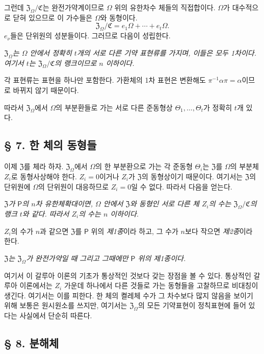 그런데 \(\mathfrak Z_\Omega/\mathfrak C\)는 완전가약계이므로 \(\Omega\) 위의 유한차수 체들의 직접합이다. \(\Omega\)가 대수적으로 닫혀 있으므로 이 가수들은 \(\Omega\)와 동형이다.
\[
        \mathfrak Z_\Omega/\mathfrak C
        =e_1\Omega+\cdots+e_t\Omega.
\]
\(e_\nu\)들은 단위원의 성분들이다. 그러므로 다음이 성립한다.

\emph{\(\mathfrak Z_\Omega\)는 \(\Omega\) 안에서 정확히 \(t\)개의 서로 다른 기약 표현류를 가지며, 이들은 모두 1차이다. 여기서 \(t\)는 \(\mathfrak Z_\Omega/\mathfrak C\)의 랭크이므로 \(n\) 이하이다.}

각 표현류는 표현을 하나만 포함한다. 가환체의 1차 표현은 변환해도 \(\pi^{-1}\alpha\pi=\alpha\)이므로 바뀌지 않기 때문이다.

따라서 \(\mathfrak Z_\Omega\)에서 \(\Omega\)의 부분환들로 가는 서로 다른 준동형상 \(\Theta_1,\ldots,\Theta_t\)가 정확히 \(t\)개 있다.

\subsection*{§ 7. 한 체의 동형들}

이제 \(\mathfrak Z\)를 체라 하자. \(\mathfrak Z_\Omega\)에서 \(\Omega\)의 한 부분환으로 가는 각 준동형 \(\Theta_i\)는 \(\mathfrak Z\)를 \(\Omega\)의 부분체 \(Z_i\)로 동형사상해야 한다. \(Z_i=0\)이거나 \(Z_i\)가 \(\mathfrak Z\)의 동형상이기 때문이다. 여기서는 \(\mathfrak Z\)의 단위원에 \(\Omega\)의 단위원이 대응하므로 \(Z_i=0\)일 수 없다. 따라서 다음을 얻는다.

\emph{\(\mathfrak Z\)가 \(\mathsf P\)의 \(n\)차 유한체확대이면, \(\Omega\) 안에서 \(\mathfrak Z\)와 동형인 서로 다른 체 \(Z_i\)의 수는 \(\mathfrak Z_\Omega/\mathfrak C\)의 랭크 \(t\)와 같다. 따라서 \(Z_i\)의 수는 \(n\) 이하이다.}

\(Z_i\)의 수가 \(n\)과 같으면 \(\mathfrak Z\)를 \(\mathsf P\) 위의 \emph{제1종}이라 하고, 그 수가 \(n\)보다 작으면 \emph{제2종}이라 한다.

\emph{\(\mathfrak Z\)는 \(\mathfrak Z_\Omega\)가 완전가약일 때 그리고 그때에만 \(\mathsf P\) 위의 제1종이다.}

여기서 이 갈루아 이론의 기초가 통상적인 것보다 갖는 장점을 볼 수 있다. 통상적인 갈루아 이론에서는 \(Z_i\) 가운데 하나에서 다른 것들로 가는 동형들을 고찰하므로 비대칭이 생긴다. 여기서는 이를 피한다. 한 체의 켤레체 수가 그 차수보다 많지 않음을 보이기 위해 보통은 원시원소를 쓰지만, 여기서는 \(\mathfrak Z_\Omega\)의 모든 기약표현이 정칙표현에 들어 있다는 사실에서 단순히 따른다.

\subsection*{§ 8. 분해체}

